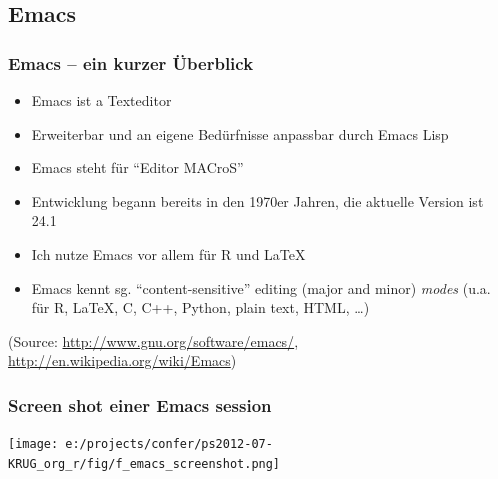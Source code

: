 \documentclass[bigger]{beamer}
\begin{document}
\subsection{Emacs}
\label{sec-2-2}
\begin{frame}
\frametitle{Emacs -- ein kurzer Überblick}
\label{sec-2-2-1}

\begin{itemize}
\item Emacs ist a Texteditor
\item Erweiterbar und an eigene Bedürfnisse anpassbar durch Emacs Lisp
\item Emacs steht für \enquote{Editor MACroS}
\item Entwicklung begann bereits in den 1970er Jahren, die aktuelle Version ist 24.1
\item Ich nutze Emacs vor allem für R und \LaTeX
\item Emacs kennt sg. \enquote{content-sensitive} editing (major and minor) \emph{modes}
  (u.a. für R, \LaTeX, C, C++, Python, plain text, HTML, \ldots{})
\end{itemize}

(Source: \href{http://www.gnu.org/software/emacs/}{http://www.gnu.org/software/emacs/}, \href{http://en.wikipedia.org/wiki/Emacs}{http://en.wikipedia.org/wiki/Emacs})
\end{frame}
\begin{frame}
\frametitle{Screen shot einer Emacs session}
\label{sec-2-2-2}


\texttt{[image: e:/projects/confer/ps2012-07-KRUG\_org\_r/fig/f\_emacs\_screenshot.png]}
\end{frame}
\end{document}
